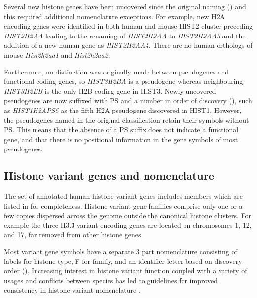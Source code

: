     Several new histone genes have been uncovered since the original
    naming ()
    and this required additional nomenclature exceptions.
    For example, new H2A encoding genes were identified in both human
    and mouse HIST2 cluster preceding \textit{HIST2H2AA}
    leading to the renaming of \textit{HIST2H2AA} to \textit{HIST2H2AA3}
    and the addition of a new human gene as \textit{HIST2H2AA4}.
    There are no human orthologs of mouse \textit{Hist2h2aa1} and \textit{Hist2h2aa2}.

    Furthermore, no distinction was originally made between
    pseudogenes and functional coding genes,
    so \textit{HIST3H2BA} is a pseudogene whereas neighbouring
    \textit{HIST3H2BB} is the only H2B coding gene in HIST3.
    Newly uncovered pseudogenes are now suffixed with PS and a
    number in order of discovery (),
    such as \textit{HIST1H2APS5} as the fifth H2A pseudogene discovered in HIST1.
    However, the pseudogenes named in the original classification retain their symbols without PS.
    This means that the absence of a PS suffix does not indicate a functional gene,
    and that there is no positional information in the gene symbols of most pseudogenes.

  \subsection{Histone variant genes and nomenclature}
    The set of annotated human histone variant genes
    includes \TotalCoreVariantGenes{} members
    which are listed in  for completeness.
    Histone variant gene families comprise only one or a few copies
    dispersed across the genome outside the canonical histone clusters.
    For example the three H3.3 variant encoding genes are located
    on chromosomes 1, 12, and 17, far removed from other histone genes.

    Most variant gene symbols have a separate 3 part nomenclature
    consisting of labels for histone type, F for family,
    and an identifier letter based on discovery order ().
    Increasing interest in histone variant function \citep{MazeAllis2014}
    coupled with a variety of usages and conflicts between species
    has led to guidelines for improved consistency in histone variant nomenclature
    \citep{Talbert2012}.
